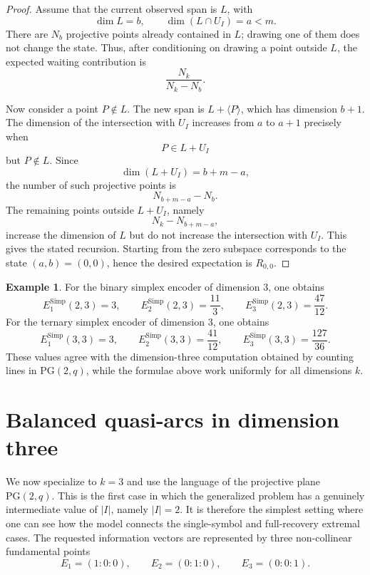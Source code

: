 \documentclass[11pt,a4paper]{article}
\numberwithin{equation}{section}
\theoremstyle{definition}
\newtheorem{example}[definition]{Example}
\theoremstyle{definition}
\newcommand{\PG}{\mathrm{PG}}
\begin{document}
\begin{proof}
Assume that the current observed span is $L$, with
\[
\dim L=b,
\qquad
\dim(L\cap U_I)=a<m.
\]
There are $N_b$ projective points already contained in $L$; drawing one of them does not change the state.  Thus, after conditioning on drawing a point outside $L$, the expected waiting contribution is
\[
\frac{N_k}{N_k-N_b}.
\]

Now consider a point $P\notin L$.  The new span is $L+\langle P\rangle$, which has dimension $b+1$.  The dimension of the intersection with $U_I$ increases from $a$ to $a+1$ precisely when
\[
P\in L+U_I
\]
but $P\notin L$.  Since
\[
\dim(L+U_I)=b+m-a,
\]
the number of such projective points is
\[
N_{b+m-a}-N_b.
\]
The remaining points outside $L+U_I$, namely
\[
N_k-N_{b+m-a},
\]
increase the dimension of $L$ but do not increase the intersection with $U_I$.  This gives the stated recursion.  Starting from the zero subspace corresponds to the state $(a,b)=(0,0)$, hence the desired expectation is $R_{0,0}$.
\end{proof}

\begin{example}\label{ex:simplex-small-values}
For the binary simplex encoder of dimension $3$, one obtains
\[
E_1^{\mathrm{Simp}}(2,3)=3,
\qquad
E_2^{\mathrm{Simp}}(2,3)=\frac{11}{3},
\qquad
E_3^{\mathrm{Simp}}(2,3)=\frac{47}{12}.
\]
For the ternary simplex encoder of dimension $3$, one obtains
\[
E_1^{\mathrm{Simp}}(3,3)=3,
\qquad
E_2^{\mathrm{Simp}}(3,3)=\frac{41}{12},
\qquad
E_3^{\mathrm{Simp}}(3,3)=\frac{127}{36}.
\]
These values agree with the dimension-three computation obtained by counting lines in $\PG(2,q)$, while the formulae above work uniformly for all dimensions $k$.
\end{example}

\section{Balanced quasi-arcs in dimension three}\label{sec:dimension-three}

We now specialize to $k=3$ and use the language of the projective plane $\PG(2,q)$.  This is the first case in which the generalized problem has a genuinely intermediate value of $|I|$, namely $|I|=2$.  It is therefore the simplest setting where one can see how the model connects the single-symbol and full-recovery extremal cases.  The requested information vectors are represented by three non-collinear fundamental points
\[
E_1=(1:0:0),\qquad E_2=(0:1:0),\qquad E_3=(0:0:1).
\]
\end{document}
